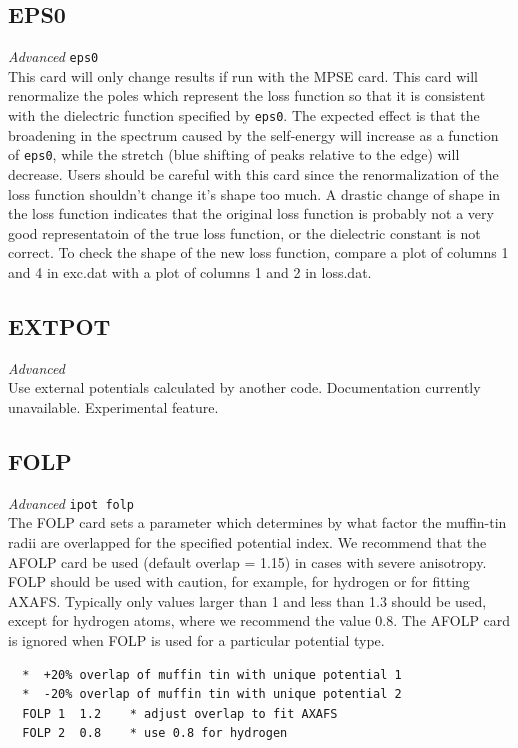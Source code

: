 \documentclass[11pt,oneside]{report} %
\renewcommand{\htmlref}[2]{\hyperlink{#2}{#1}}
\newenvironment{Card}[4]%
      {\vspace{3ex}%
        \subsection{#1}
        \quad\textsl{#3}\newline
        \quad\texttt{#2}\newline%
        \label{card:#4}\\}
      {}
\renewcommand{\htmlref}[2]{{#1}} %
\begin{document}
\begin{Card}{EPS0}{eps0}{Advanced}{eps}
  This card will only change results if run with the
  \htmlref{MPSE}{card:mps} card. This card will renormalize the poles
  which represent the loss function
  so that it is consistent with the dielectric function
  specified by \texttt{eps0}. The expected effect is that the
  broadening in the spectrum caused by the self-energy will increase
  as a function of \texttt{eps0}, while the stretch (blue shifting of
  peaks relative to the edge) will decrease. Users should be careful
  with this card since the renormalization of the loss function
  shouldn't change it's shape too much. A drastic change of shape in
  the loss function indicates that the original loss function is
  probably not a very good representatoin of the true loss function,
  or the dielectric constant is not correct. To check the shape of the
  new loss function, compare a plot of columns 1 and 4 in exc.dat with
  a plot of columns 1 and 2 in loss.dat.
\end{Card}



\begin{Card}{EXTPOT}{}{Advanced}{ext}
  Use external potentials calculated by another code.  Documentation currently unavailable.  Experimental feature.
\end{Card}



\begin{Card}{FOLP}{ipot folp}{Advanced}{fol}
  The FOLP card sets a parameter which determines by what factor the
  muffin-tin radii are overlapped for the specified potential index. 
  We recommend that the \htmlref{AFOLP}{card:afo} 
  card be used (default overlap = 1.15) in cases with severe anisotropy.
  FOLP should be used with caution, for example, for hydrogen or for 
  fitting AXAFS. Typically only values larger than 1 and less than 1.3
  should be used, except for hydrogen atoms, where we recommend
  the value 0.8. The AFOLP card is ignored when FOLP
  is used for a particular potential type.
\begin{verbatim}
  *  +20% overlap of muffin tin with unique potential 1
  *  -20% overlap of muffin tin with unique potential 2
  FOLP 1  1.2    * adjust overlap to fit AXAFS
  FOLP 2  0.8    * use 0.8 for hydrogen
\end{verbatim}
\end{Card}
\end{document}
